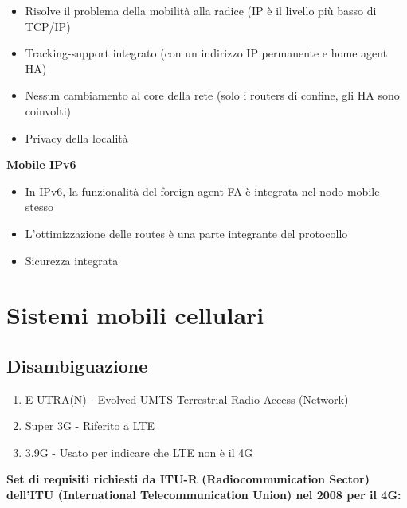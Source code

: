 \begin{itemize}
  \item Risolve il problema della mobilità alla radice (IP è il livello più
basso di TCP/IP)
  \item Tracking-support integrato (con un indirizzo IP permanente e home agent
HA)
  \item Nessun cambiamento al core della rete (solo i routers di confine,
gli HA sono coinvolti) 
  \item Privacy della località
\end{itemize}

\textbf{Mobile IPv6}

\begin{itemize}
  \item In IPv6, la funzionalità del foreign agent FA è integrata nel nodo
mobile stesso
  \item L'ottimizzazione delle routes è una parte integrante del protocollo
  \item Sicurezza integrata
\end{itemize}

\section{Sistemi mobili cellulari}

\subsection{Disambiguazione}

\begin{enumerate}
  \item E-UTRA(N) - Evolved UMTS Terrestrial Radio Access (Network)
  \item Super 3G - Riferito a LTE
  \item 3.9G - Usato per indicare che LTE non è il 4G
\end{enumerate}

\textbf{Set di requisiti richiesti da ITU-R (Radiocommunication Sector)
dell'ITU (International Telecommunication Union) nel 2008 per il 4G:}

